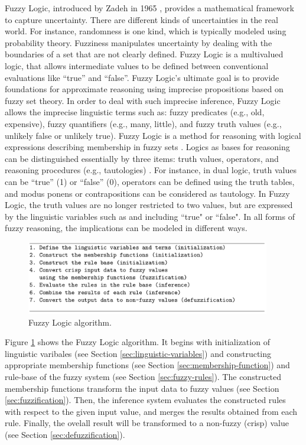 \documentclass[11pt]{article}
\begin{document}
Fuzzy Logic, introduced by Zadeh in 1965 \cite{zadeh:fuzzy}, provides a
mathematical framework to capture uncertainty. There are different kinds of
uncertainties in the real world. For instance, randomness is one kind, which is
typically modeled using probability theory. Fuzziness manipulates uncertainty by
dealing with the boundaries of a set that are not clearly defined. Fuzzy Logic
is a multivalued logic, that allows intermediate values to be defined between
conventional evaluations like ``true'' and ``false''. Fuzzy Logic's ultimate
goal is to provide foundations for approximate reasoning using imprecise
propositions based on fuzzy set theory. In order to deal with such imprecise
inference, Fuzzy Logic allows the imprecise linguistic terms such as:
fuzzy predicates (e.g., old, expensive), fuzzy quantifiers (e.g., many, little),
and fuzzy truth values (e.g., unlikely false or unlikely true). Fuzzy Logic is a
method for reasoning with logical expressions describing membership in fuzzy
sets \cite{russell:ai-modern}. Logics as bases for reasoning can be
distinguished essentially by three items: truth values, operators, and reasoning
procedures (e.g., tautologies) \cite{zimmermann:fuzzy-sets}. For instance, in
dual logic, truth values can be ``true'' (1) or ``false'' (0), operators can be
defined using the truth tables, and modus ponens or contrapositions can be
considered as tautology. In Fuzzy Logic, the truth values are no longer
restricted to two values, but are expressed by the linguistic variables such as
and including ``true" or ``false". In all forms of fuzzy reasoning, the
implications can be modeled in different ways.

\begin{figure}[tbh]
  \center
  \includegraphics[width=0.95\textwidth]{figure/fuzzy-algorithm.png}
  \caption{Fuzzy Logic algorithm.}
  \label{fig:fuzzy-algorithm}
\end{figure}

Figure \ref{fig:fuzzy-algorithm} shows the Fuzzy Logic algorithm. It begins
with initialization of linguistic varibales (see Section
\ref{sec:linguistic-variables}) and constructing appropriate membership
functions (see Section \ref{sec:membership-function}) and rule-base of the
fuzzy system (see Section \ref{sec:fuzzy-rules}). The constructed membership
functions transform the input data to fuzzy values (see Section
\ref{sec:fuzzification}). Then, the inference system evaluates the constructed
rules with respect to the given input value, and merges the results obtained
from each rule. Finally, the ovelall result will be transformed to a non-fuzzy
(crisp) value (see Section \ref{sec:defuzzification}).
\end{document}
